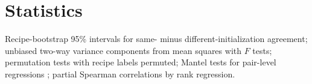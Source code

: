 \documentclass[11pt]{article}
\begin{document}
\section{Statistics}
\label{app:stats}
Recipe-bootstrap 95\% intervals for same- minus different-initialization agreement; unbiased two-way variance components from mean squares with $F$ tests; permutation tests with recipe labels permuted; Mantel tests for pair-level regressions \citep{mantel1967detection}; partial Spearman correlations by rank regression.
\end{document}
